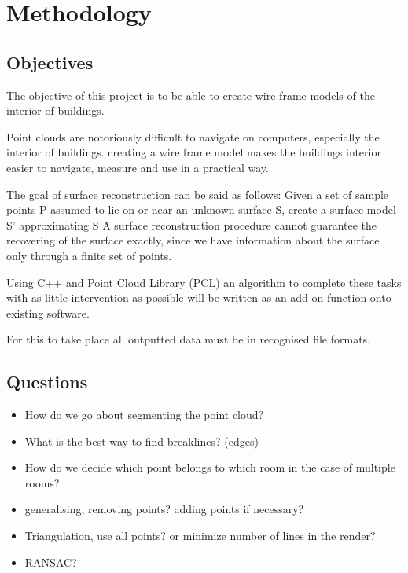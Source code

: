 



\section{Methodology}

\subsection{Objectives}

The objective of this project is to be able to create wire frame models of the interior of buildings.

Point clouds are notoriously difficult to navigate on computers, especially the interior of buildings. creating a wire frame model makes the buildings interior easier to navigate, measure and use in a practical way.

The goal of surface reconstruction can be said as follows: Given a set of sample points P assumed to lie on or near an unknown surface S, create a surface model S' approximating S
A surface reconstruction procedure cannot guarantee the recovering of the surface exactly, since we have information about the surface only through a finite set of points.

Using C++ and Point Cloud Library (PCL) an algorithm to complete these tasks with as little intervention as possible will be written as an add on function onto existing software.

For this to take place all outputted data must be in recognised file formats.


\subsection{Questions}
\begin{itemize}

\item How do we go about segmenting the point cloud?

\item What is the best way to find breaklines? (edges)

\item How do we decide which point belongs to which room in the case of multiple rooms?

\item generalising, removing points? adding points if necessary?

\item Triangulation, use all points? or minimize number of lines in the render?

\item RANSAC?

\end{itemize}


